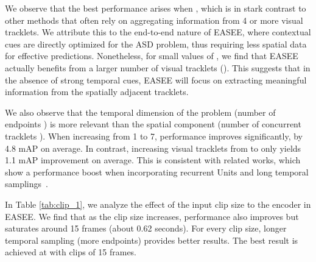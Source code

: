 \documentclass[10pt,twocolumn,letterpaper]{article}
\begin{document}
We observe that the best performance arises when , which is in stark contrast to other methods \cite{kopuklu2021design,leon2021maas,zhang2021unicon} that often rely on aggregating information from 4 or more visual tracklets. We attribute this to the end-to-end nature of EASEE, where contextual cues are directly optimized for the ASD problem, thus requiring less spatial data for effective predictions. Nonetheless, for small values of , we find that EASEE actually benefits from a larger number of visual tracklets (). This suggests that in the absence of strong temporal cues, EASEE will focus on extracting meaningful information from the spatially adjacent tracklets.

We also observe that the temporal dimension of the problem (number of endpoints ) is more relevant than the spatial component (number of concurrent tracklets ). When increasing  from 1 to 7, performance improves significantly, by 4.8 mAP on average. In contrast, increasing visual tracklets from  to  only yields 1.1 mAP improvement on average. This is consistent with related works, which show a performance boost when incorporating recurrent Units and long temporal samplings~\cite{roth2020ava,alcazar2020active,kopuklu2021design}. 

In Table \ref{tab:clip_1}, we analyze the effect of the input clip size to the encoder  in EASEE. We find that as the clip size increases, performance also improves but saturates around 15 frames (about 0.62 seconds). For every clip size, longer temporal sampling (more endpoints) provides better results. The best result is achieved at  with clips of 15 frames. 
\end{document}
